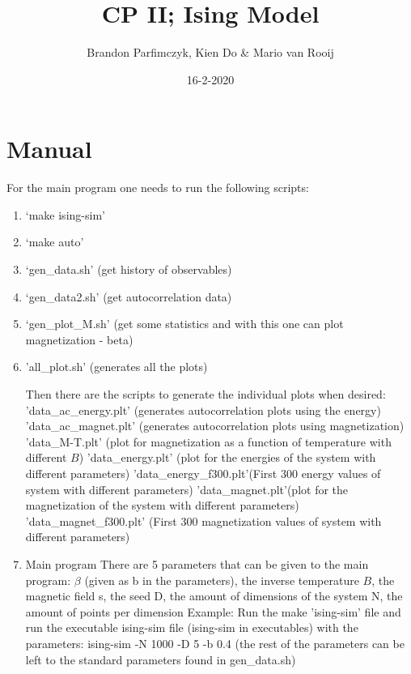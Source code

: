 \documentclass[11pt,a4paper]{article}
\title{CP II; Ising Model}
\author{Brandon Parfimczyk, Kien Do \& Mario van Rooij }
\date{16-2-2020}
\begin{document}
\maketitle

\tableofcontents
\newpage

\section{Manual}

For the main program one needs to run the following scripts:
\begin{enumerate}
    \item ‘make ising-sim’ 
    \item ‘make auto’
    \item ‘gen\_data.sh’ (get history of observables)
    \item ‘gen\_data2.sh’ (get autocorrelation data)
    \item ‘gen\_plot\_M.sh’ (get some statistics and with this one can plot magnetization - beta) 
    \item 'all\_plot.sh' (generates all the plots)
    
        \subitem Then there are the scripts to generate the individual plots when desired:
        \subitem 'data\_ac\_energy.plt' (generates autocorrelation plots using the energy)
        \subitem 'data\_ac\_magnet.plt' (generates autocorrelation plots using magnetization)
        \subitem 'data\_M-T.plt' (plot for magnetization as a function of temperature with different $B$)
        \subitem 'data\_energy.plt' (plot for the energies of the system with different parameters)
        \subitem 'data\_energy\_f300.plt'(First 300 energy values of system with different parameters)
        \subitem 'data\_magnet.plt'(plot for the magnetization of the system with different parameters)
        \subitem 'data\_magnet\_f300.plt' (First 300 magnetization values of system with different parameters)

    \item Main program
        \subitem There are 5 parameters that can be given to the main program:
        \subitem $\beta$ (given as b in the parameters), the inverse temperature
        \subitem $B$, the magnetic field
        \subitem s, the seed
        \subitem D, the amount of dimensions of the system
        \subitem N, the amount of points per dimension
        \subitem Example: Run the make 'ising-sim' file and run the executable ising-sim file (ising-sim in executables) with the parameters: 
    ising-sim -N 1000 -D 5 -b 0.4 (the rest of the parameters can be left to the standard parameters found in gen\_data.sh) 
\end{enumerate}
\end{document}

